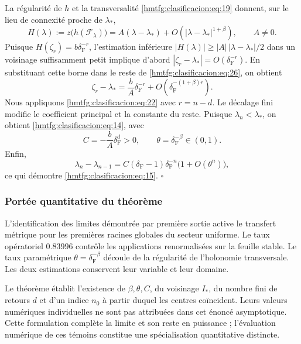 La régularité de \(h\) et la transversalité \eqref{hmtfg:clasificacion:eq:19} donnent, sur le lieu de connexité proche de \(\lambda_*\),
\begin{equation}
H(\lambda):=z\bigl(h(\mathcal F_\lambda)\bigr)
=A(\lambda-\lambda_*)
+O\!\left(|\lambda-\lambda_*|^{1+\beta}\right),
\qquad A\ne0.
\label{hmtfg:clasificacion:eq:26}
\end{equation}
Puisque \(H(\zeta_r)=b\delta_{\mathrm F}^{-r}\), l’estimation inférieure
\(|H(\lambda)|\ge |A|\,|\lambda-\lambda_*|/2\) dans un voisinage suffisamment petit implique d’abord
\(|\zeta_r-\lambda_*|=O(\delta_{\mathrm F}^{-r})\). En substituant cette borne dans le reste de \eqref{hmtfg:clasificacion:eq:26}, on obtient
\begin{equation}
\zeta_r-\lambda_*=\frac bA\delta_{\mathrm F}^{-r}
+O\!\left(\delta_{\mathrm F}^{-(1+\beta)r}\right).
\label{hmtfg:clasificacion:eq:27}
\end{equation}
Nous appliquons \eqref{hmtfg:clasificacion:eq:22} avec \(r=n-d\). Le décalage fini modifie le coefficient principal et la constante du reste. Puisque \(\lambda_n<\lambda_*\), on obtient \eqref{hmtfg:clasificacion:eq:14}, avec
\[
C=-\frac bA\delta_{\mathrm F}^d>0,
\qquad \theta=\delta_{\mathrm F}^{-\beta}\in(0,1).
\]
Enfin,
\[
\lambda_n-\lambda_{n-1}
=C(\delta_{\mathrm F}-1)\delta_{\mathrm F}^{-n}\bigl(1+O(\theta^n)\bigr),
\]
ce qui démontre \eqref{hmtfg:clasificacion:eq:15}. \(\square\)


\subsubsection{Portée quantitative du théorème}
\label{hmtfg:clasificacion:8.5}

L’identification des limites démontrée par première sortie active le transfert métrique pour les premières racines globales du secteur uniforme. Le taux opératoriel \(0.83996\) contrôle les applications renormalisées sur la feuille stable. Le taux paramétrique \(\theta=\delta_{\mathrm F}^{-\beta}\) découle de la régularité de l’holonomie transversale. Les deux estimations conservent leur variable et leur domaine.

Le théorème établit l’existence de \(\beta,\theta,C\), du voisinage \(I_*\), du nombre fini de retours \(d\) et d’un indice \(n_0\) à partir duquel les centres coïncident. Leurs valeurs numériques individuelles ne sont pas attribuées dans cet énoncé asymptotique. Cette formulation complète la limite et son reste en puissance ; l’évaluation numérique de ces témoins constitue une spécialisation quantitative distincte.
